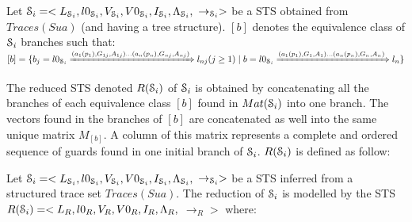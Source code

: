 \begin{definition}
Let $\EuScript{S}_i\\=<L_{\EuScript{S}_i},l0_{\EuScript{S}_i},V_{\EuScript{S}_i},V0_{\EuScript{S}_i},I_{\EuScript{S}_i},\Lambda_{\EuScript{S}_i},$ $\rightarrow_{\EuScript{S}_i}>$ be a STS obtained from $Traces(Sua)$ (and having a tree structure). $[b]$ denotes the equivalence class of $\EuScript{S}_i$ branches such that:\\ $[b]=\{ b_j= l0_{\EuScript{S}_i} \xRightarrow{(a_1(p_1),G_{1j},A_{1j})...(a_n(p_n),G_{nj},A_{nj})} l_{nj}(j\geq 1) \mid b=l0_{\EuScript{S}_i} \xRightarrow{(a_1(p_1),G_{1},A_{1})...(a_n(p_n),G_{n},A_{n})} l_n\}$
\end{definition}

The reduced STS denoted $R(\EuScript{S}_i)$ of $\EuScript{S}_i$
is obtained by concatenating all the branches of each equivalence
class $[b]$ found in $Mat(\EuScript{S}_i)$ into one branch. The
vectors found in the branches of $[b]$ are concatenated as well
into the same unique matrix $M_{[b]}$. A column of this matrix
represents a complete and ordered sequence of guards found in one
initial branch of $\EuScript{S}_i$. $R(\EuScript{S}_i)$ is
defined as follow:

\begin{definition}%
	\label{rule:min}

	Let $\EuScript{S}_i=<L_{\EuScript{S}_i},l0_{\EuScript{S}_i},V_{\EuScript{S}_i},V0_{\EuScript{S}_i},I_{\EuScript{S}_i},\Lambda_{\EuScript{S}_i},$ $\rightarrow_{\EuScript{S}_i}>$ be
    a STS inferred from a structured trace set $Traces(Sua)$. The reduction of $\EuScript{S}_i$ is modelled by the STS
	$R(\EuScript{S}_i)= <L_R,l0_R,\\ V_R,V0_R,I_R,\Lambda_R,$
	$\rightarrow_R>$ where:

\end{definition}

